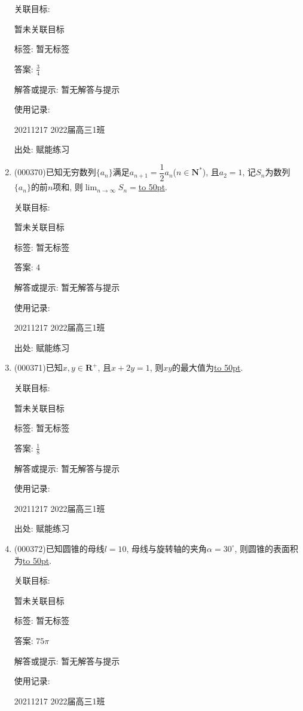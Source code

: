 \documentclass[10pt,a4paper]{article}
\newcommand{\blank}[1]{\underline{\hbox to #1pt{}}}
\begin{document}
\begin{enumerate}[1.]
关联目标:

暂未关联目标



标签: 暂无标签

答案: $\frac 34$

解答或提示: 暂无解答与提示

使用记录:

20211217	2022届高三1班	


出处: 赋能练习
\item { (000370)}已知无穷数列$\{a_n\}$满足$a_{n+1}=\dfrac12{a_n}$($n\in \mathbf{N}^*$), 且$a_2=1$, 记$S_n$为数列$\{a_n\}$的前$n$项和, 则$\displaystyle\lim_{n\to \infty}S_n=$\blank{50}.


关联目标:

暂未关联目标



标签: 暂无标签

答案: $4$

解答或提示: 暂无解答与提示

使用记录:

20211217	2022届高三1班	


出处: 赋能练习
\item { (000371)}已知$x,y\in \mathbf{R}^+$, 且$x+2y=1$, 则$xy$的最大值为\blank{50}.


关联目标:

暂未关联目标



标签: 暂无标签

答案: $\frac 18$

解答或提示: 暂无解答与提示

使用记录:

20211217	2022届高三1班	


出处: 赋能练习
\item { (000372)}已知圆锥的母线$l=10$, 母线与旋转轴的夹角$\alpha =30^\circ$, 则圆锥的表面积为\blank{50}.


关联目标:

暂未关联目标



标签: 暂无标签

答案: $75\pi$

解答或提示: 暂无解答与提示

使用记录:

20211217	2022届高三1班	



\end{enumerate}
\end{document}

